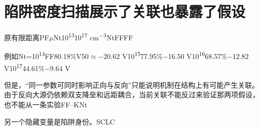 \documentclass[11pt,a4paper]{article}
\begin{document}
\section{{\cjkfont 陷阱密度扫描展示了关联也暴露了假设}\allowbreak{}}\label{sec:26}
{\cjkfont 原有限距离}\allowbreak{}PF\allowbreak{}\ensuremath{\mu}\allowbreak{}Nt\allowbreak{}10\textsuperscript{13}\allowbreak{}10\textsuperscript{17} cm\textsuperscript{−3}\allowbreak{}Nt\allowbreak{}FF\allowbreak{}FF\allowbreak{}
\par
{\cjkfont 例如}\allowbreak{}Nt=\allowbreak{}10\textsuperscript{14}\allowbreak{}FF\allowbreak{}80.18\%\allowbreak{}V50\ensuremath{\approx}\allowbreak{}−20.62 V\allowbreak{}10\textsuperscript{15}\allowbreak{}77.95\%\allowbreak{}−16.50 V\allowbreak{}10\textsuperscript{16}\allowbreak{}68.57\%\allowbreak{}−12.82 V\allowbreak{}10\textsuperscript{17}\allowbreak{}44.61\%\allowbreak{}−9.64 V\allowbreak{}
\par
{\cjkfont 但是，“同一参数可同时影响正向与反向”只能说明机制在结构上有可能产生关联。由于反向大源仍依赖双支降垒和远距耦合，当前关联不能反过来验证那两项假设，也不能从一条实验}\allowbreak{}FF–K\allowbreak{}Nt\allowbreak{}
\par
{\cjkfont 另一个隐藏变量是陷阱身份。}\allowbreak{}SCLC\allowbreak{}
\par
\end{document}
